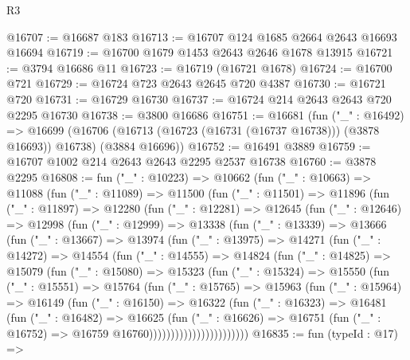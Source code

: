 \begin{lexlean}{R3}
\begin{coremodule}
@16707 := @16687 @183
@16713 := @16707 @124 @1685 @2664 @2643 @16693 @16694
@16719 := @16700 @1679 @1453 @2643 @2646 @1678 @13915
@16721 := @3794 @16686 @11
@16723 := @16719 (@16721 @1678)
@16724 := @16700 @721
@16729 := @16724 @723 @2643 @2645 @720 @4387
@16730 := @16721 @720
@16731 := @16729 @16730
@16737 := @16724 @214 @2643 @2643 @720 @2295 @16730
@16738 := @3800 @16686
@16751 := @16681
    (fun ("_" : @16492) =>
    @16699 (@16706 (@16713 (@16723 (@16731 (@16737 @16738))) (@3878 @16693)) @16738) (@3884 @16696))
@16752 := @16491 @3889
@16759 := @16707 @1002 @214 @2643 @2643 @2295 @2537 @16738
@16760 := @3878 @2295
@16808 := fun ("_" : @10223) =>
  @10662
    (fun ("_" : @10663) =>
    @11088
      (fun ("_" : @11089) =>
      @11500
        (fun ("_" : @11501) =>
        @11896
          (fun ("_" : @11897) =>
          @12280
            (fun ("_" : @12281) =>
            @12645
              (fun ("_" : @12646) =>
              @12998
                (fun ("_" : @12999) =>
                @13338
                  (fun ("_" : @13339) =>
                  @13666
                    (fun ("_" : @13667) =>
                    @13974
                      (fun ("_" : @13975) =>
                      @14271
                        (fun ("_" : @14272) =>
                        @14554
                          (fun ("_" : @14555) =>
                          @14824
                            (fun ("_" : @14825) =>
                            @15079
                              (fun ("_" : @15080) =>
                              @15323
                                (fun ("_" : @15324) =>
                                @15550
                                  (fun ("_" : @15551) =>
                                  @15764
                                    (fun ("_" : @15765) =>
                                    @15963
                                      (fun ("_" : @15964) =>
                                      @16149
                                        (fun ("_" : @16150) =>
                                        @16322
                                          (fun ("_" : @16323) =>
                                          @16481
                                            (fun ("_" : @16482) =>
                                            @16625
                                              (fun ("_" : @16626) =>
                                              @16751
                                                (fun ("_" : @16752) =>
                                                @16759 @16760)))))))))))))))))))))))
@16835 := fun (typeId : @17) =>

\end{coremodule}
\end{lexlean}
